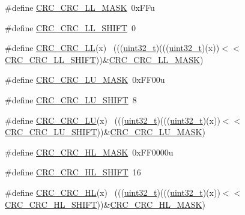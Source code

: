 \begin{DoxyCompactItemize}
\item 
\#define \hyperlink{group___c_r_c___register___masks_ga4ed4d658d7b0998f99f2e7a67781b741}{C\+R\+C\+\_\+\+C\+R\+C\+\_\+\+L\+L\+\_\+\+M\+A\+SK}~0x\+F\+Fu
\item 
\#define \hyperlink{group___c_r_c___register___masks_ga33b62a4af618b4dced75e79b9e764609}{C\+R\+C\+\_\+\+C\+R\+C\+\_\+\+L\+L\+\_\+\+S\+H\+I\+FT}~0
\item 
\#define \hyperlink{group___c_r_c___register___masks_ga2627598dd0397194169ba3d3fd351bcb}{C\+R\+C\+\_\+\+C\+R\+C\+\_\+\+LL}(x)                                                    ~(((\hyperlink{_p_e___types_8h_a33594304e786b158f3fb30289278f5af}{uint32\+\_\+t})(((\hyperlink{_p_e___types_8h_a33594304e786b158f3fb30289278f5af}{uint32\+\_\+t})(x))$<$$<$\hyperlink{group___c_r_c___register___masks_ga33b62a4af618b4dced75e79b9e764609}{C\+R\+C\+\_\+\+C\+R\+C\+\_\+\+L\+L\+\_\+\+S\+H\+I\+FT}))\&\hyperlink{group___c_r_c___register___masks_ga4ed4d658d7b0998f99f2e7a67781b741}{C\+R\+C\+\_\+\+C\+R\+C\+\_\+\+L\+L\+\_\+\+M\+A\+SK})
\item 
\#define \hyperlink{group___c_r_c___register___masks_gafd70dfedcb7a56d90936b633f6b72c8b}{C\+R\+C\+\_\+\+C\+R\+C\+\_\+\+L\+U\+\_\+\+M\+A\+SK}~0x\+F\+F00u
\item 
\#define \hyperlink{group___c_r_c___register___masks_gaf49b0d3034c80d25be6484b90f06d5a8}{C\+R\+C\+\_\+\+C\+R\+C\+\_\+\+L\+U\+\_\+\+S\+H\+I\+FT}~8
\item 
\#define \hyperlink{group___c_r_c___register___masks_gacf55a6aa9391f22a4c4760c9fd7f7a0c}{C\+R\+C\+\_\+\+C\+R\+C\+\_\+\+LU}(x)                                                    ~(((\hyperlink{_p_e___types_8h_a33594304e786b158f3fb30289278f5af}{uint32\+\_\+t})(((\hyperlink{_p_e___types_8h_a33594304e786b158f3fb30289278f5af}{uint32\+\_\+t})(x))$<$$<$\hyperlink{group___c_r_c___register___masks_gaf49b0d3034c80d25be6484b90f06d5a8}{C\+R\+C\+\_\+\+C\+R\+C\+\_\+\+L\+U\+\_\+\+S\+H\+I\+FT}))\&\hyperlink{group___c_r_c___register___masks_gafd70dfedcb7a56d90936b633f6b72c8b}{C\+R\+C\+\_\+\+C\+R\+C\+\_\+\+L\+U\+\_\+\+M\+A\+SK})
\item 
\#define \hyperlink{group___c_r_c___register___masks_ga3bda7420d175ce8cfc9acf5726265dad}{C\+R\+C\+\_\+\+C\+R\+C\+\_\+\+H\+L\+\_\+\+M\+A\+SK}~0x\+F\+F0000u
\item 
\#define \hyperlink{group___c_r_c___register___masks_ga48dd9ee135e23cc28dfb3574ec525161}{C\+R\+C\+\_\+\+C\+R\+C\+\_\+\+H\+L\+\_\+\+S\+H\+I\+FT}~16
\item 
\#define \hyperlink{group___c_r_c___register___masks_ga2a85a4bfea71cb8ddea4102adf856f21}{C\+R\+C\+\_\+\+C\+R\+C\+\_\+\+HL}(x)                                                    ~(((\hyperlink{_p_e___types_8h_a33594304e786b158f3fb30289278f5af}{uint32\+\_\+t})(((\hyperlink{_p_e___types_8h_a33594304e786b158f3fb30289278f5af}{uint32\+\_\+t})(x))$<$$<$\hyperlink{group___c_r_c___register___masks_ga48dd9ee135e23cc28dfb3574ec525161}{C\+R\+C\+\_\+\+C\+R\+C\+\_\+\+H\+L\+\_\+\+S\+H\+I\+FT}))\&\hyperlink{group___c_r_c___register___masks_ga3bda7420d175ce8cfc9acf5726265dad}{C\+R\+C\+\_\+\+C\+R\+C\+\_\+\+H\+L\+\_\+\+M\+A\+SK})
$$
\end{DoxyCompactItemize}

